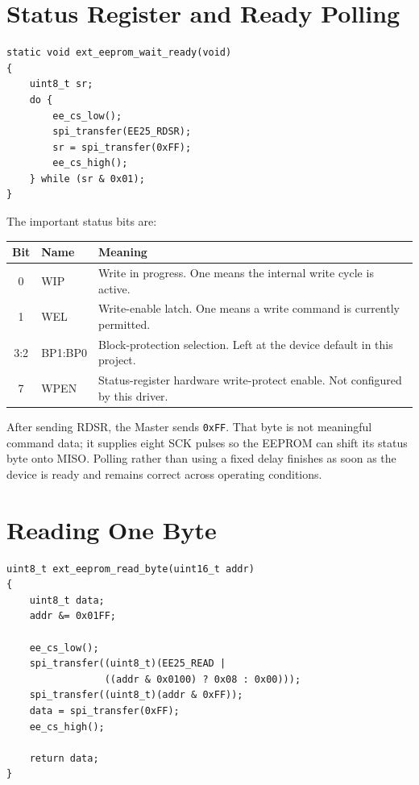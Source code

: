 \documentclass[11pt,a4paper]{article}
\begin{document}
\section{Status Register and Ready Polling}

\begin{lstlisting}[style=cstyle,caption={Waiting for the internal write cycle.}]
static void ext_eeprom_wait_ready(void)
{
    uint8_t sr;
    do {
        ee_cs_low();
        spi_transfer(EE25_RDSR);
        sr = spi_transfer(0xFF);
        ee_cs_high();
    } while (sr & 0x01);
}
\end{lstlisting}

The important status bits are:
\begin{table}[H]
\centering
\begin{tabular}{clp{}}
\toprule
Bit & Name & Meaning \\
\midrule
0 & WIP & Write in progress. One means the internal write cycle is active. \\
1 & WEL & Write-enable latch. One means a write command is currently permitted. \\
3:2 & BP1:BP0 & Block-protection selection. Left at the device default in this project. \\
7 & WPEN & Status-register hardware write-protect enable. Not configured by this driver. \\
\bottomrule
\end{tabular}
\end{table}

After sending RDSR, the Master sends \texttt{0xFF}. That byte is not meaningful command data; it supplies eight SCK pulses so the EEPROM can shift its status byte onto MISO. Polling rather than using a fixed delay finishes as soon as the device is ready and remains correct across operating conditions.

\section{Reading One Byte}

\begin{lstlisting}[style=cstyle,caption={Single-byte read sequence.}]
uint8_t ext_eeprom_read_byte(uint16_t addr)
{
    uint8_t data;
    addr &= 0x01FF;

    ee_cs_low();
    spi_transfer((uint8_t)(EE25_READ |
                 ((addr & 0x0100) ? 0x08 : 0x00)));
    spi_transfer((uint8_t)(addr & 0xFF));
    data = spi_transfer(0xFF);
    ee_cs_high();

    return data;
}
\end{lstlisting}
\end{document}
